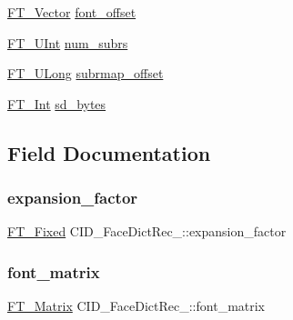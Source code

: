 \begin{DoxyCompactItemize}
\item 
\hyperlink{ftimage_8h_ab158b5a7e422acb1968af95db786d018}{F\+T\+\_\+\+Vector} \hyperlink{struct_c_i_d___face_dict_rec___aa62daa8d45ed4a817f1207cbd452d61e}{font\+\_\+offset}
\item 
\hyperlink{fttypes_8h_abcb8db4dbf35d2b55a9e8c7b0926dc52}{F\+T\+\_\+\+U\+Int} \hyperlink{struct_c_i_d___face_dict_rec___a611c406c8d7cd2e37d077070f4bb3ebe}{num\+\_\+subrs}
\item 
\hyperlink{fttypes_8h_a4fac88bdba78eb76b505efa6e4fbf3f5}{F\+T\+\_\+\+U\+Long} \hyperlink{struct_c_i_d___face_dict_rec___a45d58111727af70018289e7c5b64ba8c}{subrmap\+\_\+offset}
\item 
\hyperlink{fttypes_8h_af90e5fb0d07e21be9fe6faa33f02484c}{F\+T\+\_\+\+Int} \hyperlink{struct_c_i_d___face_dict_rec___aecdf98f9671f22c1715ec929b77767ce}{sd\+\_\+bytes}
\end{DoxyCompactItemize}


\subsection{Field Documentation}
\mbox{\label{struct_c_i_d___face_dict_rec___ae601bb5bc25e9a5f3da8e7c12fef6c92}} 
\subsubsection{\texorpdfstring{expansion\+\_\+factor}{expansion\_factor}}
{\footnotesize\ttfamily \hyperlink{fttypes_8h_a5f5a679cc09f758efdd0d1c5feed3c3d}{F\+T\+\_\+\+Fixed} C\+I\+D\+\_\+\+Face\+Dict\+Rec\+\_\+\+::expansion\+\_\+factor}

\mbox{\label{struct_c_i_d___face_dict_rec___aa418f6ce40b7574b6234e0ab48377e4b}} 
\subsubsection{\texorpdfstring{font\+\_\+matrix}{font\_matrix}}
{\footnotesize\ttfamily \hyperlink{fttypes_8h_afeacbc4365cf2ad77162b6292f3e3e23}{F\+T\+\_\+\+Matrix} C\+I\+D\+\_\+\+Face\+Dict\+Rec\+\_\+\+::font\+\_\+matrix}

